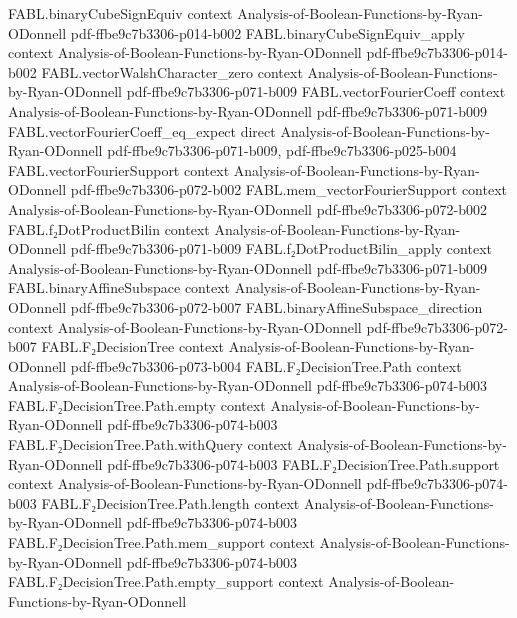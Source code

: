\begin{theorem}
\proofstep
  {FABL.binaryCubeSignEquiv}
  {context}
  {Analysis-of-Boolean-Functions-by-Ryan-ODonnell}
  {pdf-ffbe9c7b3306-p014-b002}
\proofstep
  {FABL.binaryCubeSignEquiv_apply}
  {context}
  {Analysis-of-Boolean-Functions-by-Ryan-ODonnell}
  {pdf-ffbe9c7b3306-p014-b002}
\proofstep
  {FABL.vectorWalshCharacter_zero}
  {context}
  {Analysis-of-Boolean-Functions-by-Ryan-ODonnell}
  {pdf-ffbe9c7b3306-p071-b009}
\proofstep
  {FABL.vectorFourierCoeff}
  {context}
  {Analysis-of-Boolean-Functions-by-Ryan-ODonnell}
  {pdf-ffbe9c7b3306-p071-b009}
\proofstep
  {FABL.vectorFourierCoeff_eq_expect}
  {direct}
  {Analysis-of-Boolean-Functions-by-Ryan-ODonnell}
  {pdf-ffbe9c7b3306-p071-b009,
    pdf-ffbe9c7b3306-p025-b004}
\proofstep
  {FABL.vectorFourierSupport}
  {context}
  {Analysis-of-Boolean-Functions-by-Ryan-ODonnell}
  {pdf-ffbe9c7b3306-p072-b002}
\proofstep
  {FABL.mem_vectorFourierSupport}
  {context}
  {Analysis-of-Boolean-Functions-by-Ryan-ODonnell}
  {pdf-ffbe9c7b3306-p072-b002}
\proofstep
  {FABL.f₂DotProductBilin}
  {context}
  {Analysis-of-Boolean-Functions-by-Ryan-ODonnell}
  {pdf-ffbe9c7b3306-p071-b009}
\proofstep
  {FABL.f₂DotProductBilin_apply}
  {context}
  {Analysis-of-Boolean-Functions-by-Ryan-ODonnell}
  {pdf-ffbe9c7b3306-p071-b009}
\proofstep
  {FABL.binaryAffineSubspace}
  {context}
  {Analysis-of-Boolean-Functions-by-Ryan-ODonnell}
  {pdf-ffbe9c7b3306-p072-b007}
\proofstep
  {FABL.binaryAffineSubspace_direction}
  {context}
  {Analysis-of-Boolean-Functions-by-Ryan-ODonnell}
  {pdf-ffbe9c7b3306-p072-b007}
\proofstep
  {FABL.F₂DecisionTree}
  {context}
  {Analysis-of-Boolean-Functions-by-Ryan-ODonnell}
  {pdf-ffbe9c7b3306-p073-b004}
\proofstep
  {FABL.F₂DecisionTree.Path}
  {context}
  {Analysis-of-Boolean-Functions-by-Ryan-ODonnell}
  {pdf-ffbe9c7b3306-p074-b003}
\proofstep
  {FABL.F₂DecisionTree.Path.empty}
  {context}
  {Analysis-of-Boolean-Functions-by-Ryan-ODonnell}
  {pdf-ffbe9c7b3306-p074-b003}
\proofstep
  {FABL.F₂DecisionTree.Path.withQuery}
  {context}
  {Analysis-of-Boolean-Functions-by-Ryan-ODonnell}
  {pdf-ffbe9c7b3306-p074-b003}
\proofstep
  {FABL.F₂DecisionTree.Path.support}
  {context}
  {Analysis-of-Boolean-Functions-by-Ryan-ODonnell}
  {pdf-ffbe9c7b3306-p074-b003}
\proofstep
  {FABL.F₂DecisionTree.Path.length}
  {context}
  {Analysis-of-Boolean-Functions-by-Ryan-ODonnell}
  {pdf-ffbe9c7b3306-p074-b003}
\proofstep
  {FABL.F₂DecisionTree.Path.mem_support}
  {context}
  {Analysis-of-Boolean-Functions-by-Ryan-ODonnell}
  {pdf-ffbe9c7b3306-p074-b003}
\proofstep
  {FABL.F₂DecisionTree.Path.empty_support}
  {context}
  {Analysis-of-Boolean-Functions-by-Ryan-ODonnell}

\end{theorem}
